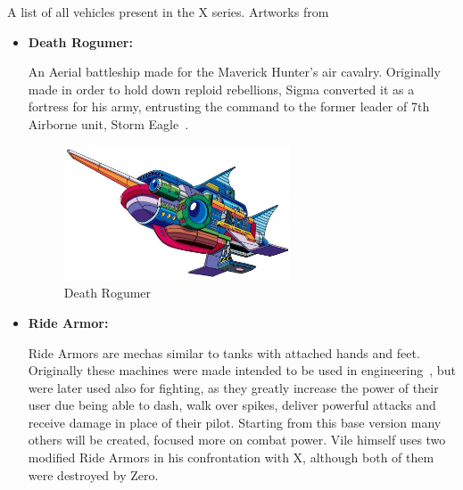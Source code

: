 \renewcommand{\portraitsize}{4cm}
A list of all vehicles present in the X series. Artworks from~\cite{book:MMX_Complete_art}
\begin{itemize}
	\item \hypertarget{vehicle:Death_Rogumer}{\textbf{Death Rogumer:}}
	An Aerial battleship made for the Maverick Hunter's air cavalry. Originally made in order to hold down reploid rebellions, Sigma converted it as a fortress 
	for his army, entrusting the command to the former leader of 7th Airborne unit, Storm Eagle~\cite{wayback:X_resources}.
	\begin{figure}[htp]
		\centering
		\includegraphics[height=4cm]{figures/X1/Storm_eagle/DeathRogumer.jpg}
		\caption{Death Rogumer}
	\end{figure}
	\item \hypertarget{vehicle:Ride_Armor}{\textbf{Ride Armor:}}
	Ride Armors are mechas similar to tanks with attached hands and feet. Originally these machines were made intended to be used in engineering~\cite{wayback:X_resources}, but were later used also for fighting, as they greatly increase the power of their user due being able to dash, walk over spikes, deliver powerful attacks and receive damage in place of 
	their pilot. Starting from this base version many others will be created, focused more on combat power. Vile himself uses two modified Ride Armors in his confrontation with X, although both of them were destroyed by Zero.
	\begin{figure}[htp]
		\centering

\end{figure}
\end{itemize}
